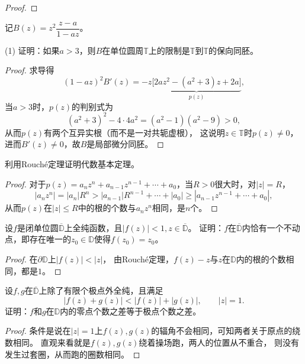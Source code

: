 \begin{proof}
\end{proof}

\begin{5}
    记$B(z)=z^2\dfrac{z-a}{1-az}$。

    (1) 证明：如果$a>3$，则$B$在单位圆周$\mathbb{T}$上的限制是$\mathbb{T}$到$\mathbb{T}$的保向同胚。
\end{5}
\begin{proof}
    求导得\[(1-az)^2B'(z)=-z\underbrace{\big[2az^2-(a^2+3)z+2a\big]}_{p(z)},\]
    当$a>3$时，$p(z)$的判别式为\[(a^2+3)^2-4\cdot4a^2=(a^2-1)(a^2-9)>0,\]
    从而$p(z)$有两个互异实根（而不是一对共轭虚根），
    这说明$z\in\mathbb{T}$时$p(z)\ne0$，进而$B'(z)\ne0$，故$B$是局部微分同胚。
\end{proof}

\begin{8}
    利用Rouché定理证明代数基本定理。
\end{8}
\begin{proof}
    对于$p(z)=a_nz^n+a_{n-1}z^{n-1}+\cdots+a_0$，当$R>0$很大时，对$|z|=R$，
    \[|a_nz^n|=|a_n|R^n>|a_{n-1}|R^{n-1}+\cdots+|a_0|\ge|a_{n-1}z^{n-1}+\cdots+a_0|,\]
    从而$p(z)$在$|z|\le R$中的根的个数与$a_nz^n$相同，是$n$个。
\end{proof}

\begin{9}
    设$f$是闭单位圆$\overline{\mathbb{D}}$上全纯函数，且$|f(z)|<1,z\in\overline{\mathbb{D}}$。
    证明：$f$在$\overline{\mathbb{D}}$内恰有一个不动点，即存在唯一的$z_0\in\mathbb{D}$使得$f(z_0)=z_0$。
\end{9}
\begin{proof}
    在$\partial\mathbb{D}$上$|f(z)|<|z|$，
    由Rouché定理，$f(z)-z$与$z$在$\mathbb{D}$内的根的个数相同，都是$1$。
\end{proof}

\begin{10}
    设$f,g$在$\overline{\mathbb{D}}$上除了有限个极点外全纯，且满足
    \[|f(z)+g(z)|<|f(z)|+|g(z)|,\qquad|z|=1.\]
    证明：$f$和$g$在$\mathbb{D}$内的零点个数之差等于极点个数之差。
\end{10}
\begin{proof}
    条件是说在$|z|=1$上$f(z),g(z)$的辐角不会相同，可知两者关于原点的绕数相同。
    直观来看就是$f(z),g(z)$绕着操场跑，两人的位置从不重合，
    则没有发生过套圈，从而跑的圈数相同。
\end{proof}

